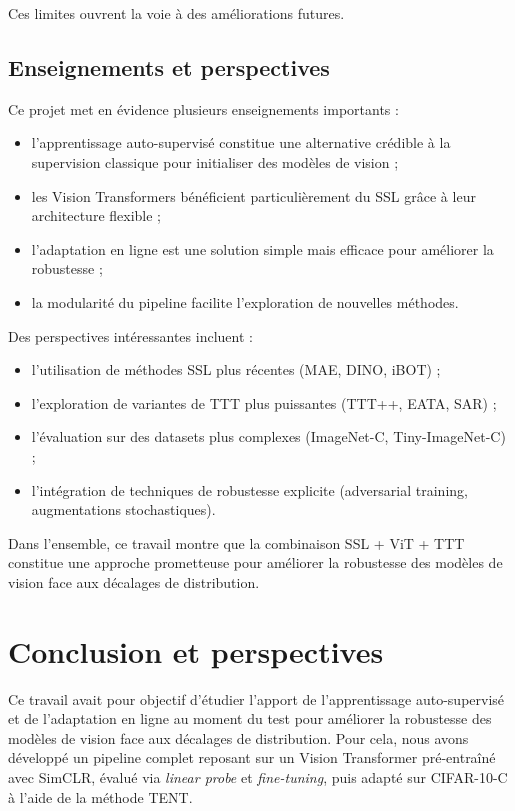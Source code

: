 \documentclass[12pt,a4paper]{report}
\begin{document}
	Ces limites ouvrent la voie à des améliorations futures.
	
	\section*{Enseignements et perspectives}
	
	Ce projet met en évidence plusieurs enseignements importants :
	
	\begin{itemize}
		\item l’apprentissage auto-supervisé constitue une alternative crédible à la supervision classique pour initialiser des modèles de vision ;
		\item les Vision Transformers bénéficient particulièrement du SSL grâce à leur architecture flexible ;
		\item l’adaptation en ligne est une solution simple mais efficace pour améliorer la robustesse ;
		\item la modularité du pipeline facilite l’exploration de nouvelles méthodes.
	\end{itemize}
	
	Des perspectives intéressantes incluent :
	\begin{itemize}
		\item l’utilisation de méthodes SSL plus récentes (MAE, DINO, iBOT) ;
		\item l’exploration de variantes de TTT plus puissantes (TTT++, EATA, SAR) ;
		\item l’évaluation sur des datasets plus complexes (ImageNet-C, Tiny-ImageNet-C) ;
		\item l’intégration de techniques de robustesse explicite (adversarial training, augmentations stochastiques).
	\end{itemize}
	
	Dans l’ensemble, ce travail montre que la combinaison SSL + ViT + TTT constitue une approche prometteuse pour améliorer la robustesse des modèles de vision face aux décalages de distribution.
	
	\chapter{Conclusion et perspectives}
	
	Ce travail avait pour objectif d’étudier l’apport de l’apprentissage auto-supervisé et de l’adaptation en ligne au moment du test pour améliorer la robustesse des modèles de vision face aux décalages de distribution. Pour cela, nous avons développé un pipeline complet reposant sur un Vision Transformer pré-entraîné avec SimCLR, évalué via \textit{linear probe} et \textit{fine-tuning}, puis adapté sur CIFAR-10-C à l’aide de la méthode TENT.
	
\end{document}
